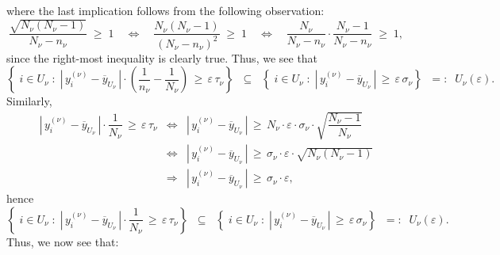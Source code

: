 where the last implication follows from the following observation:
\begin{equation*}
\dfrac{\sqrt{N_{\nu}(N_{\nu}-1)}}{N_{\nu} - n_{\nu}} \;\geq\; 1
\quad\Longleftrightarrow\quad
\dfrac{N_{\nu}(N_{\nu}-1)}{(N_{\nu} - n_{\nu})^{2}} \;\geq\; 1
\quad\Longleftrightarrow\quad
\dfrac{N_{\nu}}{N_{\nu} - n_{\nu}}\cdot\dfrac{N_{\nu}-1}{N_{\nu} - n_{\nu}}\;\geq\; 1,
\end{equation*}
since the right-most inequality is clearly true.
Thus, we see that
\begin{equation*}
\left\{
\; i \in U_{\nu} \;:\;
\left\vert\,y^{(\nu)}_{i} - \overline{y}_{U_{\nu}}\,\right\vert
\cdot
\left(\frac{1}{n_{\nu}} - \frac{1}{N_{\nu}}\right)
\,\geq\,\varepsilon\,\tau_{\nu}
\right\}
\;\;\subseteq\;\;
\left\{
\; i \in U_{\nu} \;:\;
\left\vert\,y^{(\nu)}_{i} - \overline{y}_{U_{\nu}}\,\right\vert
\,\geq\,\varepsilon\,\sigma_{\nu}
\right\}
\;\;=:\;\; U_{\nu}(\varepsilon).
\end{equation*}
Similarly,
\begin{eqnarray*}
\left\vert\,y^{(\nu)}_{i} - \overline{y}_{U_{\nu}}\,\right\vert \cdot \dfrac{1}{N_{\nu}}
\,\geq\,\varepsilon\,\tau_{\nu}
&\Longleftrightarrow&
\left\vert\,y^{(\nu)}_{i} - \overline{y}_{U_{\nu}}\,\right\vert
\,\geq\,
N_{\nu} \cdot \varepsilon \cdot \sigma_{\nu} \cdot
\sqrt{\dfrac{N_{\nu}-1}{N_{\nu}}}
\\
&\Longleftrightarrow&
\left\vert\,y^{(\nu)}_{i} - \overline{y}_{U_{\nu}}\,\right\vert
\,\geq\,
\sigma_{\nu} \cdot \varepsilon \cdot \sqrt{N_{\nu}(N_{\nu}-1)}
\\
&\Longrightarrow&
\left\vert\,y^{(\nu)}_{i} - \overline{y}_{U_{\nu}}\,\right\vert
\,\geq\,
\sigma_{\nu} \cdot \varepsilon,
\end{eqnarray*}
hence
\begin{equation*}
\left\{
\; i \in U_{\nu} \;:\;
\left\vert\,y^{(\nu)}_{i} - \overline{y}_{U_{\nu}}\,\right\vert
\cdot
\dfrac{1}{N_{\nu}}
\,\geq\,\varepsilon\,\tau_{\nu}
\right\}
\;\;\subseteq\;\;
\left\{
\; i \in U_{\nu} \;:\;
\left\vert\,y^{(\nu)}_{i} - \overline{y}_{U_{\nu}}\,\right\vert
\,\geq\,\varepsilon\,\sigma_{\nu}
\right\}
\;\;=:\;\; U_{\nu}(\varepsilon).
\end{equation*}
Thus, we now see that:
